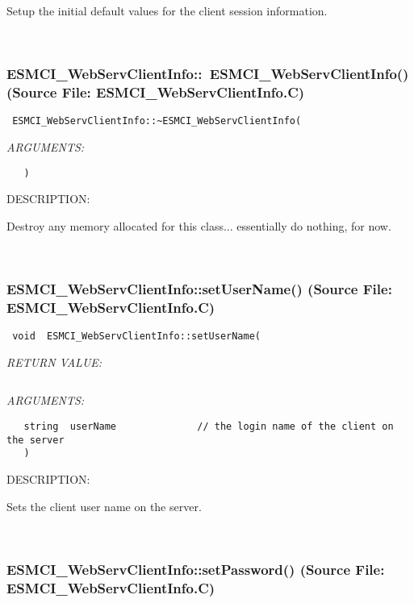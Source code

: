       Setup the initial default values for the client session information.
   
 
\mbox{}\hrulefill\
 
\subsubsection{ESMCI\_WebServClientInfo::~ESMCI\_WebServClientInfo() (Source File: ESMCI\_WebServClientInfo.C)}


  
\begin{verbatim} ESMCI_WebServClientInfo::~ESMCI_WebServClientInfo(\end{verbatim}{\em ARGUMENTS:}
\begin{verbatim}   )\end{verbatim}
{\sf DESCRIPTION:\\ }


      Destroy any memory allocated for this class... essentially do nothing,
      for now.
   
 
\mbox{}\hrulefill\
 
\subsubsection{ESMCI\_WebServClientInfo::setUserName() (Source File: ESMCI\_WebServClientInfo.C)}


  
\begin{verbatim} void  ESMCI_WebServClientInfo::setUserName(\end{verbatim}{\em RETURN VALUE:}
\begin{verbatim} \end{verbatim}{\em ARGUMENTS:}
\begin{verbatim}   string  userName              // the login name of the client on the server
   )\end{verbatim}
{\sf DESCRIPTION:\\ }


      Sets the client user name on the server.
   
 
\mbox{}\hrulefill\
 
\subsubsection{ESMCI\_WebServClientInfo::setPassword() (Source File: ESMCI\_WebServClientInfo.C)}


